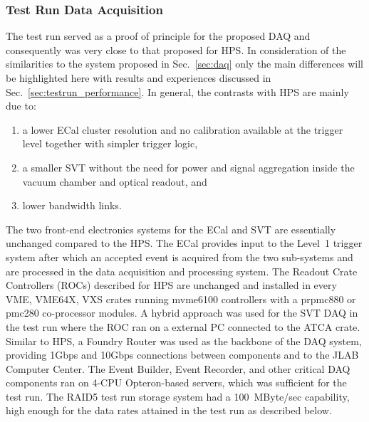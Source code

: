 
\subsubsection{Test Run Data Acquisition}
\label{sec:testrun_daq}
The test run served as a proof of principle for the proposed DAQ and consequently was very 
close to that proposed for HPS. In consideration of the similarities to the system proposed in Sec.~\ref{sec:daq} 
only the main differences will be highlighted here with results and experiences discussed in 
Sec.~\ref{sec:testrun_performance}.  In general, the contrasts with HPS are mainly due to:
\begin{enumerate}
\item a lower ECal cluster resolution and no calibration available at the trigger level together with simpler trigger logic, 
\item a smaller SVT without the need for power and signal aggregation inside the vacuum chamber 
and optical readout, and
\item lower bandwidth links.
\end{enumerate}
The two front-end electronics systems for the ECal and SVT are essentially unchanged compared to the HPS.
The ECal provides 
input to the Level~1 trigger system after which an accepted event is acquired from the two sub-systems 
and are processed in the data acquisition and processing system. The Readout Crate Controllers (ROCs)
 described for HPS are unchanged and installed in every VME, VME64X, VXS crates running 
 mvme6100 controllers with a prpmc880 or pmc280 co-processor modules. A hybrid approach was 
 used for the SVT DAQ in the test run where the ROC ran on a external PC connected to the ATCA crate. 
 Similar to HPS, a Foundry Router was used as the backbone of the DAQ system, providing 1Gbps and 
 10Gbps connections between components and to the JLAB Computer Center. The Event Builder, Event 
 Recorder, and other critical DAQ components ran on 
4-CPU Opteron-based servers, which was sufficient for the test run. The RAID5 test run storage system 
had a 100~MByte/sec capability, high enough for the data rates attained in the test run as 
described below. 







